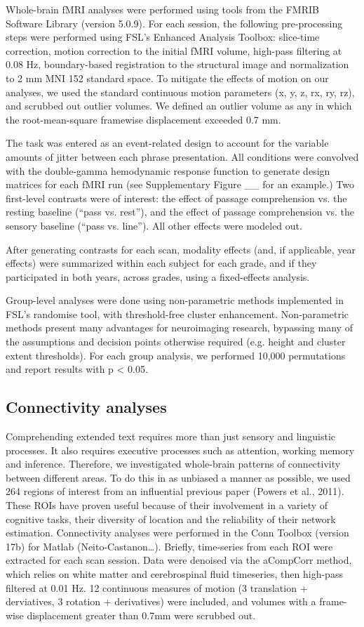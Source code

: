 Whole-brain fMRI analyses were performed using tools from the FMRIB Software Library (version 5.0.9). For each session, the following pre-processing steps were performed using FSL’s Enhanced Analysis Toolbox:  slice-time correction, motion correction to the initial fMRI volume, high-pass filtering at 0.08 Hz, boundary-based registration to the structural image and normalization to 2 mm MNI 152 standard space. To mitigate the effects of motion on our analyses, we used the standard continuous motion parameters (x, y, z, rx, ry, rz), and scrubbed out outlier volumes. We defined an outlier volume as any in which the root-mean-square framewise displacement exceeded 0.7 mm. 

The task was entered as an event-related design to account for the variable amounts of jitter between each phrase presentation. All conditions were convolved with the double-gamma hemodynamic response function to generate design matrices for each fMRI run (see Supplementary Figure __ for an example.) Two first-level contrasts were of interest: the effect of passage comprehension vs. the resting baseline (“pass vs. rest”), and the effect of passage comprehension vs. the sensory baseline (“pass vs. line”). All other effects were modeled out.

After generating contrasts for each scan, modality effects (and, if applicable, year effects) were summarized within each subject for each grade, and if they participated in both years, across grades, using a fixed-effects analysis. 

Group-level analyses were done using non-parametric methods implemented in FSL’s randomise tool, with threshold-free cluster enhancement. Non-parametric methods present many advantages for neuroimaging research, bypassing many of the assumptions and decision points otherwise required (e.g. height and cluster extent thresholds). For each group analysis, we performed 10,000 permutations and report results with p < 0.05. 

\subsection{Connectivity analyses}

Comprehending extended text requires more than just sensory and linguistic processes. It also requires executive processes such as attention, working memory and inference. Therefore, we investigated whole-brain patterns of connectivity between different areas. To do this in as unbiased a manner as possible, we used 264 regions of interest from an influential previous paper (Powers et al., 2011). These ROIs have proven useful because of their involvement in a variety of cognitive tasks, their diversity of location and the reliability of their network estimation. 
Connectivity analyses were performed in the Conn Toolbox (version 17b) for Matlab (Neito-Castanon…). Briefly, time-series from each ROI were extracted for each scan session. Data were denoised via the aCompCorr method, which relies on white matter and cerebrospinal fluid timeseries, then high-pass filtered at 0.01 Hz. 12 continuous measures of motion (3 translation + derviatives, 3 rotation + derivatives) were included, and volumes with a frame-wise displacement greater than 0.7mm were scrubbed out. 

